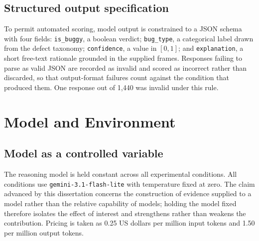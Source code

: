 \subsection{Structured output specification}
\label{sec:jsonschema}

To permit automated scoring, model output is constrained to a JSON schema
with four fields: \texttt{is\_buggy}, a boolean verdict;
\texttt{bug\_type}, a categorical label drawn from the defect taxonomy;
\texttt{confidence}, a value in $[0,1]$; and \texttt{explanation}, a short
free-text rationale grounded in the supplied frames. Responses failing to
parse as valid JSON are recorded as invalid and scored as incorrect rather
than discarded, so that output-format failures count against the condition
that produced them. One response out of 1{,}440 was invalid under this
rule.


\section{Model and Environment}
\label{sec:env_setup}

\subsection{Model as a controlled variable}

The reasoning model is held constant across all experimental conditions.
All conditions use \texttt{gemini-3.1-flash-lite} with temperature fixed
at zero. The claim advanced by this dissertation concerns the construction
of evidence supplied to a model rather than the relative capability of
models; holding the model fixed therefore isolates the effect of interest
and strengthens rather than weakens the contribution. Pricing is taken as
\num{0.25} US dollars per million input tokens and \num{1.50} per million
output tokens.

